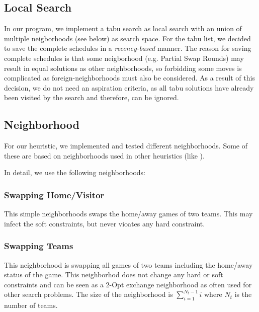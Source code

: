 \documentclass[a4paper,11pt]{article}
\begin{document}
\subsection{Local Search}
In our program, we implement a tabu search as local search with an union of multiple neigborhoods (see below) as search space.
For the tabu list, we decided to save the complete schedules in a \emph{recency-based} manner. The reason for saving complete schedules is that some neigborhood 
(e.g. Partial Swap Rounds) may result in equal solutions as other neighborhoods, so forbidding some moves is complicated as foreign-neighborhoods must also be considered.
As a result of this decision, we do not need an aspiration criteria, as all tabu solutions have already been visited by the search and therefore, can be ignored.

\subsection{Neighborhood}
For our heuristic, we implemented and tested different neighborhoods. Some of these are based on neighborhoods used in other heuristics (like \cite{Gaspero07,rvk2008, Anagnostopoulos06}).

In detail, we use the following neighborhoods:
\subsubsection{Swapping Home/Visitor}
This simple neighborhoods swaps the home/away games of two teams. This may infect the soft constraints, but never vioates any hard constraint.

\subsubsection{Swapping Teams}
This neighborhood is swapping all games of two teams including the home/away status of the game. This neighborhod does not change any hard or soft constraints and 
can be seen as a 2-Opt exchange neighborhood as often used for other search problems. The size of the neighborhood is $\sum_{i=1}^{N_t-1}i$ where $N_t$ is the number of teams.
\end{document}
